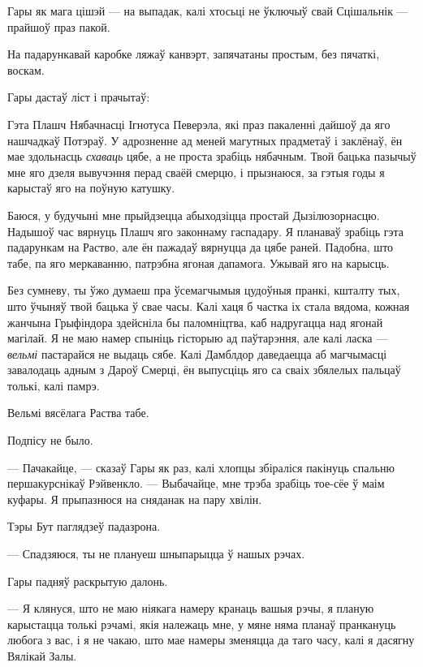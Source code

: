 Гары як мага цішэй --- на выпадак, калі хтосьці не ўключыў свай Сцішальнік ---
прайшоў праз пакой.

На падарункавай каробке ляжаў канвэрт, запячатаны простым, без пячаткі, воскам.

Гары дастаў ліст і прачытаў:

\begin{writtenNoteCursive}

Гэта Плашч Нябачнасці Ігнотуса Певерэла, які праз пакаленні дайшоў да яго нашчадкаў 
Потэраў. У адрозненне ад меней магутных прадметаў і заклёнаў, ён мае здольнасць
\emph{схаваць} цябе, а не проста зрабіць нябачным. Твой бацька пазычыў мне яго дзеля
вывучэння перад сваёй смерцю, і прызнаюся, за гэтыя годы я карыстаў яго на поўную катушку.

Баюся, у будучыні мне прыйдзецца абыходзіцца простай Дызілюзорнасцю. Надышоў час 
вярнуць Плашч яго законнаму гаспадару. Я планаваў зрабіць гэта падарункам на Раство,
але ён пажадаў вярнуцца да цябе раней. Падобна, што табе, па яго меркаванню, 
патрэбна ягоная дапамога. Ужывай яго на карысць.

Без сумневу, ты ўжо думаеш пра ўсемагчымыя цудоўныя пранкі, кшталту тых, што ўчыняў 
твой бацька ў свае часы. Калі хаця б частка іх стала вядома, кожная жанчына Грыфіндора
здейсніла бы паломніцтва, каб надругацца над ягонай магілай. Я не маю намер 
спыніць гісторыю ад паўтарэння, але калі ласка --- \emph{вельмі} пастарайся не 
выдаць сябе. Калі Дамблдор даведаецца аб магчымасці завалодаць адным з Дароў Смерці,
ён выпусціць яго са сваіх збялелых пальцаў толькі, калі памрэ.

Вельмі вясёлага Раства табе.

\end{writtenNoteCursive}

Подпісу не было.

\later


--- Пачакайце, --- сказаў Гары як раз, калі хлопцы збіраліся пакінуць спальню 
першакурснікаў Рэйвенкло. --- Выбачайце, мне трэба зрабіць тое-сёе ў маім куфары.
Я прыпазнюся на сняданак на пару хвілін.

Тэры Бут паглядзеў падазрона.

--- Спадзяюся, ты не плануеш шныпарыцца ў нашых рэчах.

Гары падняў раскрытую далонь.

--- Я клянуся, што не маю ніякага намеру кранаць вашыя рэчы, я планую карыстацца толькі
рэчамі, якія належаць мне, у мяне няма планаў пранкануць любога з вас, і 
я не чакаю, што мае намеры зменяцца да таго часу, калі я дасягну Вялікай Залы.


